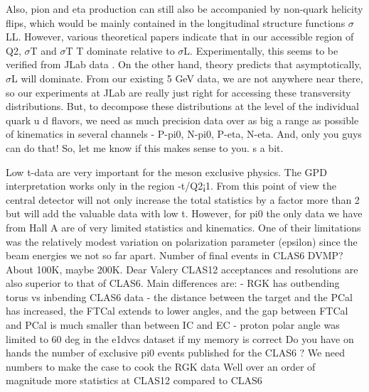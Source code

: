             Also, pion and eta production can still also be accompanied by non-quark helicity flips,
            which would be mainly contained in the longitudinal structure functions $\sigma$LL. However,
            various theoretical papers indicate that in our accessible region of Q2, $\sigma$T and $\sigma$T T dominate
            relative to $\sigma$L. Experimentally, this seems to be verified from JLab data . On the other
            hand, theory predicts that asymptotically, $\sigma$L will dominate. From our existing 5 GeV data,
            we are not anywhere near there, so our experiments at JLab are really just right for accessing
            these transversity distributions. But, to decompose these distributions at the level of the
            individual quark u d flavors, we need as much precision data over as big a range as possible
            of kinematics in several channels - P-pi0, N-pi0, P-eta, N-eta. And, only you guys can do
            that! So, let me know if this makes sense to you. s a bit.
                       
            
            Low t-data are very important for the meson exclusive physics. The GPD interpretation
            works only in the region -t/Q2¡1. From this point of view the central detector will not only
            increase the total statistics by a factor more than 2 but will add the valuable data with low
            t.
            However, for pi0 the only data we have from Hall A are of very limited statistics and
            kinematics. One of their limitations was the relatively modest variation on polarization
            parameter (epsilon) since the beam energies we not so far apart.
            Number of final events in CLAS6 DVMP? About 100K, maybe 200K.
            Dear Valery
            CLAS12 acceptances and resolutions are also superior to that of CLAS6. Main differences
            are: - RGK has outbending torus vs inbending CLAS6 data - the distance between the target
            and the PCal has increased, the FTCal extends to lower angles, and the gap between FTCal
            and PCal is much smaller than between IC and EC - proton polar angle was limited to 60
            deg in the e1dvcs dataset if my memory is correct
            Do you have on hands the number of exclusive pi0 events published for the CLAS6
            \xsecs? We need numbers to make the case to cook the RGK data
            Well over an order of magnitude more statistics at CLAS12 compared to CLAS6


